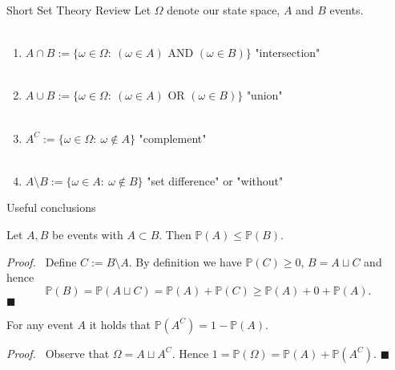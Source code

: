 \documentclass[11pt,pdf,ngerman,UKenglish,handout]{beamer}%
\newcommand{\IP}{\mathbb{P}}
\newcommand{\1}{\mathbb{1}}
\renewcommand{\qedsymbol}{$\blacksquare$}
\theoremstyle{thm}
\theoremstyle{def}
\renewenvironment{proof}{\par\noindent\textit{Proof.~}}{\hfill \qedsymbol\newline}
\begin{document}
\begin{frame}{Short Set Theory Review}
Let $\Omega$ denote our state space, $A$ and $B$ events.
\\ \
\begin{enumerate}
\item $A \cap B := \{ \omega \in \Omega:\ (\omega \in A) \text{ AND } (\omega \in B) \}$ \quad "intersection"
\\ \
\item $A \cup B := \{ \omega \in \Omega:\ (\omega \in A) \text{ OR } (\omega \in B) \}$ \quad "union"
\\ \
\item $A^C := \{ \omega \in \Omega:\ \omega \notin A \} $ {\color{gray}{$= \Omega \setminus A$}} \quad "complement"
\\ \
\item $A \setminus B := \{ \omega \in A:\ \omega \notin B \} ${\color{gray}{$= A \cap B^C$}} \quad "set difference" or "without"
\end{enumerate}
\end{frame}


\begin{frame}{Useful conclusions}
\begin{corollary}
Let $A,B$ be events with $A \subset B$. Then
\qquad $\IP(A) \leq \IP(B).$
\end{corollary}
\pause
\begin{proof}
Define $C:= B \setminus A$. By definition we have $\IP(C) \geq 0$, $B = A \sqcup C$ and hence
$$ \IP(B) = \IP(A \sqcup C) = \IP(A) + \IP(C) \geq \IP(A) +0 + \IP(A).$$
\end{proof}
\vspace{-4mm}
\pause
\begin{corollary}
For any event $A$ it holds that \qquad $\IP(A^C) = 1 - \IP(A)$.
\end{corollary}
\pause
\begin{proof}
Observe that $\Omega = A \sqcup A^C$. Hence $1= \IP(\Omega) = \IP(A) + \IP(A^C)$.
\end{proof}
\vfill
\end{frame}
\end{document}
